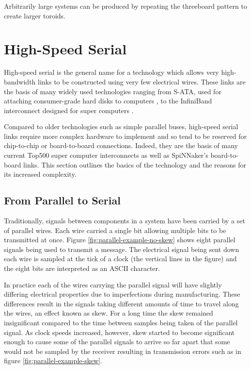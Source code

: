 			Arbitrarily large systems can be produced by repeating the threeboard
			pattern to create larger toroids.
	
	\section{High-Speed Serial}
		
		\label{sec:high-speed-serial}
		
		
		High-speed serial is the general name for a technology which allows very
		high-bandwidth links to be constructed using very few electrical wires.
		These links are the basis of many widely used technologies ranging from
		S-ATA, used for attaching consumer-grade hard disks to computers
		\cite{sataio}, to the InfiniBand interconnect designed for super computers
		\cite{infinibandta}.
		
		Compared to older technologies such as simple parallel buses, high-speed
		serial links require more complex hardware to implement and so tend to be
		reserved for chip-to-chip or board-to-board connections. Indeed, they are
		the basis of many current Top500 super computer interconnects as well as
		SpiNNaker's board-to-board links. This section outlines the basics of the
		technology and the reasons for its increased complexity.
		
		\subsection{From Parallel to Serial}
			
			Traditionally, signals between components in a system have been carried by
			a set of parallel wires. Each wire carried a single bit allowing multiple
			bits to be transmitted at once. Figure \ref{fig:parallel-example-no-skew}
			shows eight parallel signals being used to transmit a message. The
			electrical signal being sent down each wire is sampled at the tick of a
			clock (the vertical lines in the figure) and the eight bits are
			interpreted as an ASCII character.
			
			In practice each of the wires carrying the parallel signal will have
			slightly differing electrical properties due to imperfections during
			manufacturing. These differences result in the signals taking different
			amounts of time to travel along the wires, an effect known as skew. For a
			long time the skew remained insignificant compared to the time between
			samples being taken of the parallel signal. As clock speeds increased,
			however, skew started to become significant enough to cause some of the
			parallel signals to arrive so far apart that some would not be sampled by
			the receiver resulting in transmission errors such as in figure
			\ref{fig:parallel-example-skew}.
			
